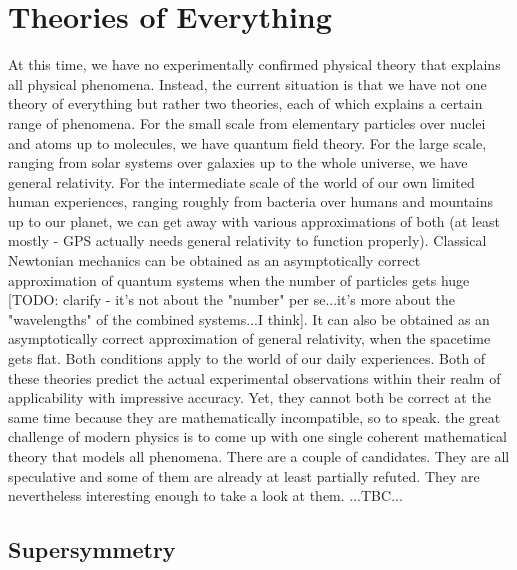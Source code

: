 
\section{Theories of Everything}
At this time, we have no experimentally confirmed physical theory that explains all physical phenomena. Instead, the current situation is that we have not one theory of everything but rather two theories, each of which explains a certain range of phenomena. For the small scale from elementary particles over nuclei and atoms up to molecules, we have quantum field theory. For the large scale, ranging from solar systems over galaxies up to the whole universe, we have general relativity. For the intermediate scale of the world of our own limited human experiences, ranging roughly from bacteria over humans and mountains up to our planet, we can get away with various approximations of both (at least mostly - GPS actually needs general relativity to function properly). Classical Newtonian mechanics can be obtained as an asymptotically correct approximation of quantum systems when the number of particles gets huge [TODO: clarify - it's not about the "number" per se...it's more about the "wavelengths" of the combined systems...I think]. It can also be obtained as an asymptotically correct approximation of general relativity, when the spacetime gets flat. Both conditions apply to the world of our daily experiences. Both of these theories predict the actual experimental observations within their realm of applicability with impressive accuracy. Yet, they cannot both be correct at the same time because they are mathematically incompatible, so to speak. the great challenge of modern physics is to come up with one single coherent mathematical theory that models all phenomena. There are a couple of candidates. They are all speculative and some of them are already at least partially refuted. They are nevertheless interesting enough to take a look at them. ...TBC...


\subsection{Supersymmetry}






